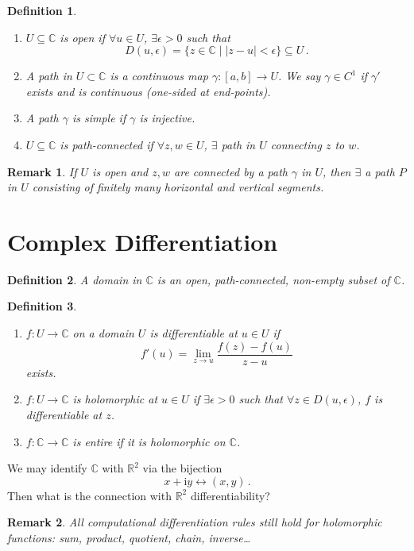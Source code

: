 \documentclass{article}
\theoremstyle{plain}\theoremheaderfont{\normalfont\itshape}\theorembodyfont{\rmfamily}\theoremseparator{.}\newtheorem*{rem}{Remark}\newtheorem*{ex}{Example}\newtheorem*{proof}{Proof}\newtheorem*{altp}{Alternative proof}\newtheorem*{con}{Consequences}\newtheorem*{notn}{Notations}\newtheorem*{cau}{Caution}\newtheorem*{term}{Terminology}\newtheorem*{keyex}{Key example}
\theoremstyle{plain}\theoremheaderfont{\normalfont\bfseries}\theorembodyfont{\rmfamily}\theoremseparator{.}\newtheorem{thm}{Theorem}[section]\newtheorem{lem}[thm]{Lemma}\newtheorem{prop}[thm]{Proposition}\newtheorem*{cor}{Corollary}\newtheorem{defn}[thm]{Definition}\newtheorem{clm}[thm]{Claim}\newtheorem{clminproof}{Claim}\newtheorem{leminproof}{Lemma}\newtheorem{app}{Application}
\theoremstyle{break}\theoremheaderfont{\normalfont\itshape}\theorembodyfont{\rmfamily}\theoremseparator{.\medskip}\newtheorem*{proofskip}{Proof}\newtheorem*{exs}{Examples}\newtheorem*{rems}{Remarks}\newtheorem*{rec}{Recall}\newtheorem*{ppts}{Properties}
\theoremstyle{break}\theoremheaderfont{\normalfont\bfseries}\theorembodyfont{\rmfamily}\theoremseparator{.\medskip}\newtheorem{lemskip}[thm]{Lemma}\newtheorem{defnskip}[thm]{Definition}\newtheorem{propskip}[thm]{Proposition}\newtheorem{thmskip}[thm]{Theorem}
\numberwithin{equation}{section}
\newcommand{\ii}{\mathrm{i}}
\newcommand{\abs}[1]{\left|#1\right|}
\newcommand{\RR}{\mathbb{R}}
\newcommand{\CC}{\mathbb{C}}
\begin{document}
    \begin{defnskip}
        \begin{enumerate}[topsep=0pt,label=(\roman*)]
            \item \(U\subseteq\CC\) is \textit{open} if \(\forall u\in U\), \(\exists\epsilon>0\) such that
            \[ D(u,\epsilon)=\{z\in\mathbb{C}\mid\abs{z-u}<\epsilon\}\subseteq U\,. \]
            \item A \textit{path} in \(U\subset\CC\) is a continuous map \(\gamma:[a,b]\to U\). We say \(\gamma\in C^1\) if \(\gamma'\) exists and is continuous (one-sided at end-points).
            \item A path \(\gamma\) is \textit{simple} if \(\gamma\) is injective.
            \item \(U\subseteq\CC\) is \textit{path-connected} if \(\forall z,w\in U\), \(\exists\) path in \(U\) connecting \(z\) to \(w\).
        \end{enumerate}
    \end{defnskip}
    \begin{rem}
        If \(U\) is open and \(z,w\) are connected by a path \(\gamma\) in \(U\), then \(\exists\) a path \(P\) in \(U\) consisting of finitely many horizontal and vertical segments.
    \end{rem}

    \newpage
    \section{Complex Differentiation}
    \begin{defn}
        A \textit{domain} in \(\CC\) is an open, path-connected, non-empty subset of \(\CC\). 
    \end{defn}
    \begin{defnskip}
        \begin{enumerate}[topsep=0pt,label=(\roman*)]
            \item \(f:U\to\mathbb{C}\) on a domain \(U\) is \textit{differentiable} at \(u\in U\) if
            \[ f'(u)=\lim_{z\to u}\frac{f(z)-f(u)}{z-u} \]
            exists.
            \item \(f:U\to\mathbb{C}\) is \textit{holomorphic} at \(u\in U\) if \(\exists\epsilon>0\) such that \(\forall z\in D(u,\epsilon)\), \(f\) is differentiable at \(z\).
            \item \(f:\CC\to\CC\) is \textit{entire} if it is holomorphic on \(\CC\).
        \end{enumerate}
    \end{defnskip}
    We may identify \(\CC\) with \(\RR^2\) via the bijection
    \[ x+\ii y\leftrightarrow(x,y)\,. \]
    Then what is the connection with \(\mathbb{R}^2\) differentiability?
    \begin{rem}
        All computational differentiation rules still hold for holomorphic functions: sum, product, quotient, chain, inverse\dots
    \end{rem}
\end{document}
